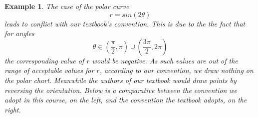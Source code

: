 \documentclass[11pt]{amsart}
\newtheorem{example}{Example}[section]
\numberwithin{equation}{section}
\begin{document}
\begin{example}
The case of the polar curve 
\begin{equation*}
r = sin(2\theta)
\end{equation*}
leads to conflict with our textbook's convention. This is due to the the fact that for angles
\begin{equation*}
\theta \in \left(\frac{\pi}{2},\pi\right) \cup \left(\frac{3\pi}{2},2\pi\right)
\end{equation*}
the corresponding value of $r$ would be negative. As such values are out of the range of acceptable values for $r$, according to our convention, we draw nothing on the polar chart. Meanwhile the authors of our textbook would draw points by reversing the orientation. Below is a comparative between the convention we adopt in this course, on the left, and the convention the textbook adopts, on the right. 


\end{example}
\end{document}
